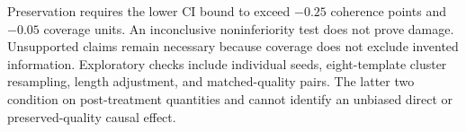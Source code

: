 Preservation requires the lower CI bound to exceed $-0.25$ coherence points and $-0.05$ coverage units. An inconclusive noninferiority test does not prove damage. Unsupported claims remain necessary because coverage does not exclude invented information. Exploratory checks include individual seeds, eight-template cluster resampling, length adjustment, and matched-quality pairs. The latter two condition on post-treatment quantities and cannot identify an unbiased direct or preserved-quality causal effect.
